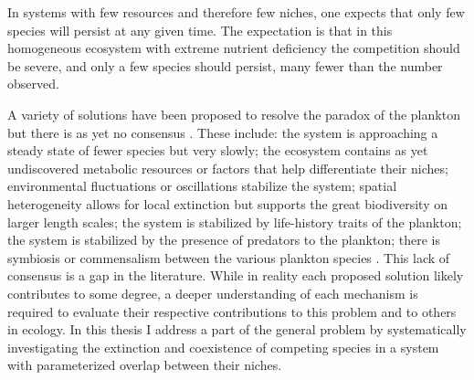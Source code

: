 In systems with few resources and therefore few niches, one expects that only few species will persist at any given time.
The expectation is that in this homogeneous ecosystem with extreme nutrient deficiency the competition should be severe, and only a few species should persist, many fewer than the number observed. 

A variety of solutions have been proposed to resolve the paradox of the plankton but there is as yet no consensus \cite{Roy2007}.
These include: the system is approaching a steady state of fewer species but very slowly; the ecosystem contains as yet undiscovered metabolic resources or factors that help differentiate their niches; environmental fluctuations or oscillations stabilize the system; spatial heterogeneity allows for local extinction but supports the great biodiversity on larger length scales; the system is stabilized by life-history traits of the plankton; the system is stabilized by the presence of predators to the plankton; there is symbiosis or commensalism between the various plankton species \cite{Hutchinson1961,May1999,Chesson2000,Roy2007}. 
This lack of consensus is a gap in the literature. 
While in reality each proposed solution likely contributes to some degree, a deeper understanding of each mechanism is required to evaluate their respective contributions to this problem and to others in ecology. 
In this thesis I address a part of the general problem by systematically investigating the extinction and coexistence of competing species in a system with parameterized overlap between their niches. %

